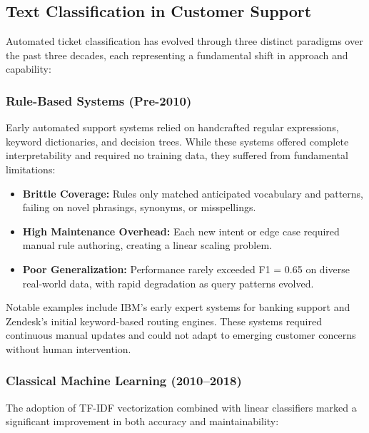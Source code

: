 \documentclass[12pt,a4paper]{article}
\begin{document}
\subsection{Text Classification in Customer Support}
\label{subsec:text-classification-history}

Automated ticket classification has evolved through three distinct paradigms over the past three decades, each representing a fundamental shift in approach and capability:

\subsubsection{Rule-Based Systems (Pre-2010)}
\label{subsubsec:rule-based}

Early automated support systems relied on handcrafted regular expressions, keyword dictionaries, and decision trees. While these systems offered complete interpretability and required no training data, they suffered from fundamental limitations:

\begin{itemize}[leftmargin=*]
    \item \textbf{Brittle Coverage:} Rules only matched anticipated vocabulary and patterns, failing on novel phrasings, synonyms, or misspellings.
    \item \textbf{High Maintenance Overhead:} Each new intent or edge case required manual rule authoring, creating a linear scaling problem.
    \item \textbf{Poor Generalization:} Performance rarely exceeded F1 = 0.65 on diverse real-world data, with rapid degradation as query patterns evolved.
\end{itemize}

Notable examples include IBM's early expert systems for banking support and Zendesk's initial keyword-based routing engines. These systems required continuous manual updates and could not adapt to emerging customer concerns without human intervention.

\subsubsection{Classical Machine Learning (2010--2018)}
\label{subsubsec:classical-ml}

The adoption of TF-IDF vectorization combined with linear classifiers marked a significant improvement in both accuracy and maintainability:
\end{document}
